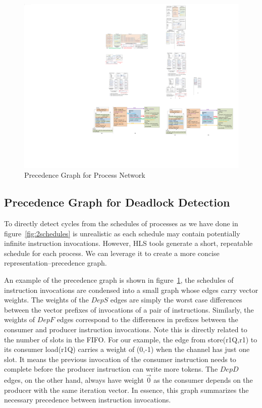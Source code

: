 \documentclass{sig-alternate}
\begin{document}
\begin{figure}[htp]
\begin{center}
\includegraphics[width=0.8\linewidth]{fig/predGraphNew.pdf}
\caption{Precedence Graph for Process Network
\label{fig:predgraph}}
\end{center}
\vspace{-2.5em}
\end{figure}



\subsection{Precedence Graph for Deadlock Detection}
To directly detect cycles from the schedules of processes as we have done in 
figure~\ref{fig:2schedules} is unrealistic as each schedule may contain potentially infinite instruction invocations.
However, HLS tools generate a short, repeatable schedule for each process.
We can leverage it to create a more concise representation--precedence graph.


An example of the precedence graph is shown in figure~\ref{fig:predgraph}, the schedules of instruction invocations are condensed into a small graph whose edges carry vector weights. 
The weights of the $DepS$ edges are simply the worst case differences between the vector prefixes of invocations of a pair of instructions. 
Similarly, the weights of $DepF$ edges correspond to the differences in prefixes between
the consumer and producer instruction invocations. Note this is directly related
to the number of slots in the FIFO. For our example, the edge from store(r1Q,r1) to its consumer load(r1Q) carries a weight of (0,-1) when the channel has just one slot.
It means the previous invocation of the consumer instruction needs to complete before the producer instruction can write more tokens. The $DepD$ edges, on the other hand, always have weight $\vec{0}$ as the consumer depends on the producer with the same iteration vector. In essence, this graph
summarizes the necessary precedence between instruction invocations. 
\end{document}
